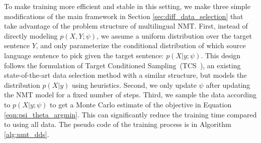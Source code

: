 To make training more efficient and stable in this setting, we make three simple modifications of the main framework in Section \ref{sec:diff_data_selection} that take advantage of the problem structure of multilingual NMT.
First, instead of directly modeling $p(X,Y;\psi)$, we assume a uniform distribution over the target sentence $Y$, %
and only parameterize the conditional distribution of which source language sentence to pick given the target sentence: $p(X|y;\psi)$. This design follows the formulation of Target Conditioned Sampling~(TCS~\citep{TCS}), an existing state-of-the-art data selection method with a similar structure, but models the distribution $p(X|y)$ using heuristics.
Second, we only update $\psi$ after updating the NMT model for a fixed number of steps.
Third, we sample the data according to $p(X|y;\psi)$ to get a Monte Carlo estimate of the objective in Equation \ref{eqn:psi_theta_argmin}.
This can significantly reduce the training time compared to using all data.
The pseudo code of the training process is in Algorithm \ref{alg:nmt_dds}.


 
